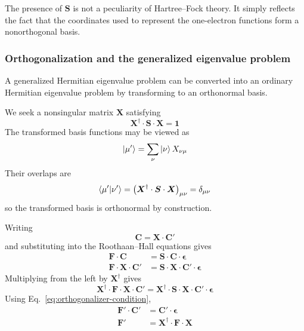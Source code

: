 \documentclass[11pt,a4paper,titlepage]{article}
\numberwithin{equation}{section}
\newcommand{\bC}{\boldsymbol{C}}
\newcommand{\bF}{\boldsymbol{F}}
\newcommand{\bI}{\boldsymbol{1}}
\newcommand{\bS}{\boldsymbol{S}}
\newcommand{\bX}{\boldsymbol{X}}
\newcommand{\beps}{\boldsymbol{\epsilon}}
\begin{document}
The presence of $\bS$ is not a peculiarity of Hartree--Fock theory. It
simply reflects the fact that the coordinates used to represent the
one-electron functions form a nonorthogonal basis.


\subsubsection{Orthogonalization and the generalized eigenvalue problem}
\label{sec:ao-orthogonalization}

A generalized Hermitian eigenvalue problem can be converted into an
ordinary Hermitian eigenvalue problem by transforming to an orthonormal
basis.

We seek a nonsingular matrix $\bX$ satisfying
\begin{equation}
  \boxed{
  \bX^\dag\cdot\bS\cdot\bX
  =
  \bI
  }
  \label{eq:orthogonalizer-condition}
\end{equation}
The transformed basis functions may be viewed as
\begin{equation}
  \ket{\mu'}
  =
  \sum_\nu
  \ket{\nu}X_{\nu\mu}
\end{equation}
Their overlaps are
\begin{equation}
  \braket{\mu'}{\nu'}
  =
  \qty(
    \bX^\dag\cdot\bS\cdot\bX
  )_{\mu\nu}
  =
  \delta_{\mu\nu}
\end{equation}
so the transformed basis is orthonormal by construction.

Writing
\begin{equation}
  \bC
  =
  \bX\cdot\bC'
  \label{eq:coefficient-transformation}
\end{equation}
and substituting into the Roothaan--Hall equations gives
\begin{equation}
\begin{split}
  \bF\cdot\bC
  &=
  \bS\cdot\bC\cdot\beps
  \\
  \bF\cdot\bX\cdot\bC'
  &=
  \bS\cdot\bX\cdot\bC'\cdot\beps
\end{split}
\end{equation}
Multiplying from the left by $\bX^\dag$ gives
\begin{equation}
  \bX^\dag\cdot\bF\cdot\bX\cdot\bC'
  =
  \bX^\dag\cdot\bS\cdot\bX\cdot\bC'\cdot\beps
\end{equation}
Using Eq.~\eqref{eq:orthogonalizer-condition},
\begin{equation}
\begin{split}
  \bF'\cdot\bC'
  &=
  \bC'\cdot\beps
  \\
  \bF'
  &=
  \bX^\dag\cdot\bF\cdot\bX
\end{split}
  \label{eq:orthogonalized-fock}
\end{equation}
\end{document}
